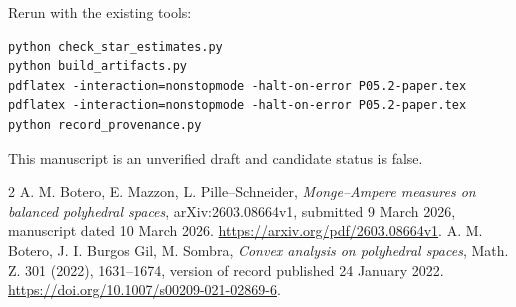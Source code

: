 \documentclass[11pt]{article}
\begin{document}
Rerun with the existing tools:
\begin{verbatim}
python check_star_estimates.py
python build_artifacts.py
pdflatex -interaction=nonstopmode -halt-on-error P05.2-paper.tex
pdflatex -interaction=nonstopmode -halt-on-error P05.2-paper.tex
python record_provenance.py
\end{verbatim}
This manuscript is an unverified draft and candidate status is false.

\begin{thebibliography}{2}
 A. M. Botero, E. Mazzon, L. Pille--Schneider,
\emph{Monge--Ampere measures on balanced polyhedral spaces}, arXiv:2603.08664v1, submitted 9 March 2026, manuscript dated 10 March 2026.
\url{https://arxiv.org/pdf/2603.08664v1}.
 A. M. Botero, J. I. Burgos Gil, M. Sombra,
\emph{Convex analysis on polyhedral spaces}, Math. Z. 301 (2022), 1631--1674, version of record published 24 January 2022.
\url{https://doi.org/10.1007/s00209-021-02869-6}.
\end{thebibliography}
\end{document}
